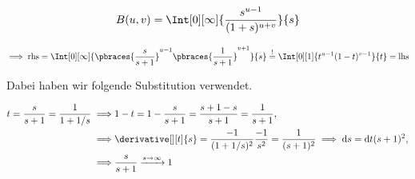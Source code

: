 
\begin{exercise}

\phantom{}

\begin{align*}
    B(u, v)
    =
    \Int[0][\infty]
    {
        \frac{s^{u-1}}{(1 + s)^{u+v}}
    }{s}
\end{align*}

\end{exercise}


\begin{solution}

\phantom{}


\begin{align*}
    \implies
    \mathrm{rhs}
    =
    \Int[0][\infty]
    {
        \pbraces
        {
            \frac{s}{s + 1}
        }^{u-1}
        \pbraces
        {
            \frac{1}{s + 1}
        }^{v+1}
    }{s}
    \stackrel{!}{=}
    \Int[0][1]{t^{u-1} (1 - t)^{v-1}}{t}
    =
    \mathrm{lhs}
\end{align*}

Dabei haben wir folgende Substitution verwendet.

\begin{align*}
    t = \frac{s}{s + 1} = \frac{1}{1 + 1/s}
    \implies
    & 1 - t = 1 - \frac{s}{s + 1} = \frac{s + 1 - s}{s + 1} = \frac{1}{s + 1}, \\
    \implies
    & \derivative[][t]{s} = \frac{-1}{(1 + 1/s)^2} \frac{-1}{s^2} = \frac{1}{(s + 1)^2} \implies \mathrm{d}s = \mathrm{d}t (s + 1)^2, \\
    \implies
    & \frac{s}{s + 1} \xrightarrow{s \to \infty} 1
\end{align*}

\end{solution}

